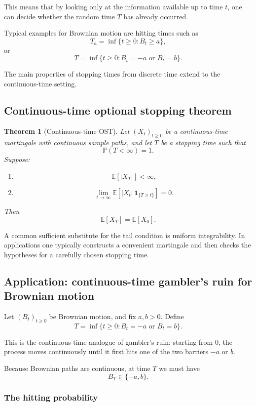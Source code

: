\documentclass[11pt]{article}
\newtheorem{theorem}{Theorem}[section]
\theoremstyle{definition}
\begin{document}
This means that by looking only at the information available up to time \(t\), one can decide whether the random time \(T\) has already occurred.

Typical examples for Brownian motion are hitting times such as
\[
T_a=\inf\{t\ge 0:B_t\ge a\},
\]
or
\[
T=\inf\{t\ge 0:B_t=-a\text{ or }B_t=b\}.
\]

The main properties of stopping times from discrete time extend to the continuous-time setting.

\subsection{Continuous-time optional stopping theorem}

\begin{theorem}[Continuous-time OST]
Let \((X_t)_{t\ge 0}\) be a continuous-time martingale with continuous sample paths, and let \(T\) be a stopping time such that
\[
\mathbb P(T<\infty)=1.
\]
Suppose:
\begin{enumerate}[label=(\roman*)]
    \item
    \[
    \mathbb E[|X_T|]<\infty,
    \]
    \item
    \[
    \lim_{t\to\infty}\mathbb E\!\left[|X_t|\,\mathbf 1_{\{T\ge t\}}\right]=0.
    \]
\end{enumerate}
Then
\[
\mathbb E[X_T]=\mathbb E[X_0].
\]
\end{theorem}

A common sufficient substitute for the tail condition is uniform integrability. In applications one typically constructs a convenient martingale and then checks the hypotheses for a carefully chosen stopping time.

\subsection{Application: continuous-time gambler's ruin for Brownian motion}

Let \((B_t)_{t\ge 0}\) be Brownian motion, and fix \(a,b>0\). Define
\[
T=\inf\{t\ge 0:B_t=-a\text{ or }B_t=b\}.
\]

This is the continuous-time analogue of gambler's ruin: starting from \(0\), the process moves continuously until it first hits one of the two barriers \(-a\) or \(b\).

Because Brownian paths are continuous, at time \(T\) we must have
\[
B_T\in\{-a,b\}.
\]

\subsubsection{The hitting probability}
\end{document}
